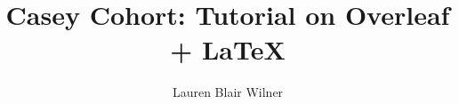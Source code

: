 \documentclass[11pt]{article}
\begin{document}



\title{Casey Cohort: Tutorial on Overleaf + \LaTeX}
\author{Lauren Blair Wilner}

\maketitle
\clearpage











\clearpage
\end{document}
